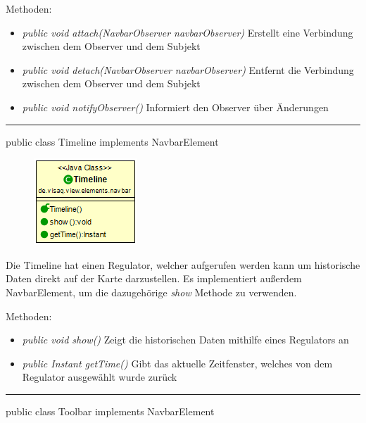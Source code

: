 Methoden:
\begin{itemize}
    \item \emph{public void attach(NavbarObserver navbarObserver)} Erstellt eine Verbindung zwischen dem Observer und dem Subjekt 
    \item \emph{public void detach(NavbarObserver navbarObserver)} Entfernt die Verbindung zwischen dem Observer und dem Subjekt
    \item \emph{public void notifyObserver()} Informiert den Observer über Änderungen
\end{itemize}

\clearpage %
\rule{\textwidth}{0.4pt}
public class Timeline implements NavbarElement

\begin{minipage}{0.3\textwidth}
    \begin{figure}[H]
        \includegraphics[scale = 0.7]{media/frontend/view/de.view.elements.navbar/TimelineClass.png}
    \end{figure}
    \end{minipage} \hfill
\begin{minipage}{0.6\textwidth}
Die Timeline hat einen Regulator, welcher aufgerufen werden kann um historische Daten direkt auf der Karte darzustellen. Es implementiert außerdem NavbarElement, um die dazugehörige \emph{show} Methode zu verwenden.
\end{minipage}

Methoden:
\begin{itemize}
    \item \emph{public void show()} Zeigt die historischen Daten mithilfe eines Regulators an
    \item \emph{public Instant getTime()} Gibt das aktuelle Zeitfenster, welches von dem Regulator ausgewählt wurde zurück
\end{itemize}

\rule{\textwidth}{0.4pt}
public class Toolbar implements NavbarElement

